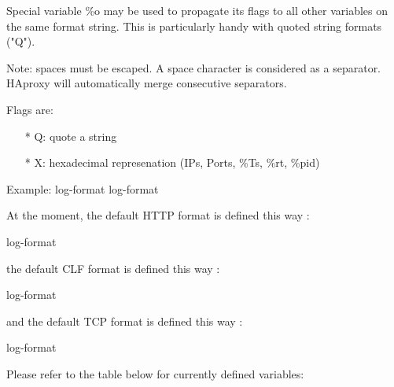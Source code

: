 Special variable \%o may be used to propagate its flags to all other
variables on the same format string. This is particularly handy with quoted
string formats ("Q").

Note: spaces must be escaped. A space character is considered as a separator.
HAproxy will automatically merge consecutive separators.

Flags are:
\begin{itemize}
\item[*] Q: quote a string
\item[*] X: hexadecimal represenation (IPs, Ports, \%Ts, \%rt, \%pid)
\end{itemize}

\begin{example}{Example:}
    log-format %
    log-format %

At the moment, the default HTTP format is defined this way :

    log-format %

the default CLF format is defined this way :

    log-format %

and the default TCP format is defined this way :

    log-format %
\end{example}

Please refer to the table below for currently defined variables:

